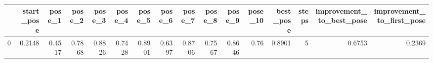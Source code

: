 \begin{tabular}{lrrrrrrrrrrrrrrr}
\toprule
{} &  start\_pose &  pose\_1 &  pose\_2 &  pose\_3 &  pose\_4 &  pose\_5 &  pose\_6 &  pose\_7 &  pose\_8 &  pose\_9 &  pose\_10 &  best\_pose &  steps &  improvement\_to\_best\_pose &  improvement\_to\_first\_pose \\
\midrule
0 &      0.2148 &  0.4517 &  0.7868 &  0.8826 &  0.7428 &  0.8901 &  0.6397 &  0.8706 &  0.7567 &  0.8646 &     0.76 &     0.8901 &      5 &                    0.6753 &                     0.2369 \\
\bottomrule
\end{tabular}

